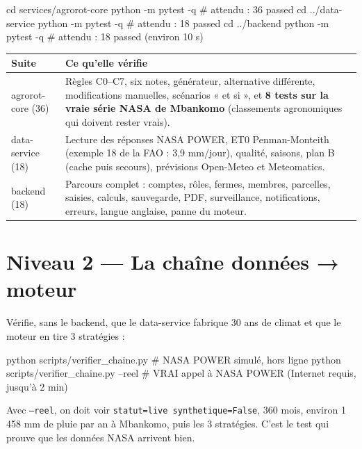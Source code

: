 \documentclass[11pt,a4paper]{article}
\begin{document}
\begin{code}
cd services/agrorot-core
python -m pytest -q          # attendu : 36 passed
cd ../data-service
python -m pytest -q          # attendu : 18 passed
cd ../backend
python -m pytest -q          # attendu : 18 passed (environ 10 s)
\end{code}

\begin{center}
\begin{tabularx}{\textwidth}{L{2.8cm}Y}
\toprule
\textbf{Suite} & \textbf{Ce qu'elle vérifie} \\
\midrule
agrorot-core (36) & Règles C0–C7, six notes, générateur, alternative différente, modifications manuelles, scénarios « et si », et \textbf{8 tests sur la vraie série NASA de Mbankomo} (classements agronomiques qui doivent rester vrais). \\
data-service (18) & Lecture des réponses NASA POWER, ET0 Penman-Monteith (exemple 18 de la FAO : 3,9 mm/jour), qualité, saisons, plan B (cache puis secours), prévisions Open-Meteo et Meteomatics. \\
backend (18) & Parcours complet : comptes, rôles, fermes, membres, parcelles, saisies, calculs, sauvegarde, PDF, surveillance, notifications, erreurs, langue anglaise, panne du moteur. \\
\bottomrule
\end{tabularx}
\end{center}

\section{Niveau 2 — La chaîne données → moteur}

Vérifie, sans le backend, que le data-service fabrique 30 ans de climat et que le moteur en tire 3 stratégies :

\begin{code}
python scripts/verifier_chaine.py           # NASA POWER simulé, hors ligne
python scripts/verifier_chaine.py --reel    # VRAI appel à NASA POWER (Internet requis, jusqu'à 2 min)
\end{code}

Avec \texttt{--reel}, on doit voir \texttt{statut=live synthetique=False}, 360 mois, environ 1\,458 mm de
pluie par an à Mbankomo, puis les 3 stratégies. C'est le test qui prouve que les données NASA arrivent bien.

\end{document}
